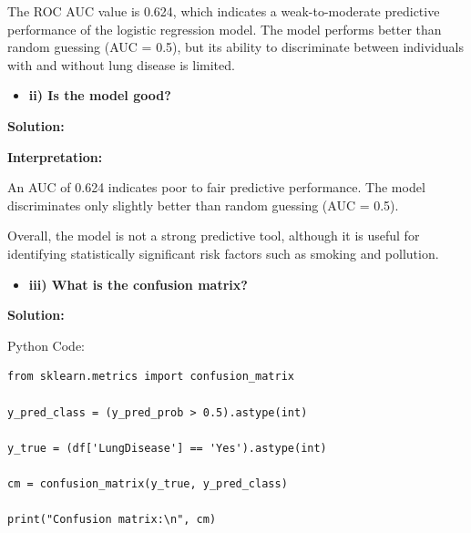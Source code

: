 \documentclass[12pt]{article}
\begin{document}
The ROC AUC value is 0.624, which indicates a weak-to-moderate predictive performance of the logistic regression model. The model performs better than random guessing (AUC = 0.5), but its ability to discriminate between individuals with and without lung disease is limited.

\vspace{0.3cm}

\begin{itemize}
    \item\textbf{ii) Is the model good?}
\end{itemize}

{\large\textbf{Solution:}}

\vspace{0.1cm}

\textbf{Interpretation:}

\vspace{0.4cm}

An AUC of 0.624 indicates poor to fair predictive performance. The model discriminates only slightly better than random guessing (AUC = 0.5).

\vspace{0.3cm}

Overall, the model is not a strong predictive tool, although it is useful for identifying statistically significant risk factors such as smoking and pollution.

\vspace{0.3cm}

\begin{itemize}
    \item\textbf{iii) What is the confusion matrix?}
\end{itemize}

{\large\textbf{Solution:}}

\vspace{0.1cm}

{\large{Python Code:}}

\vspace{0.2cm}

\begin{verbatim}
from sklearn.metrics import confusion_matrix

y_pred_class = (y_pred_prob > 0.5).astype(int)

y_true = (df['LungDisease'] == 'Yes').astype(int)

cm = confusion_matrix(y_true, y_pred_class)

print("Confusion matrix:\n", cm)
\end{verbatim}
\end{document}
